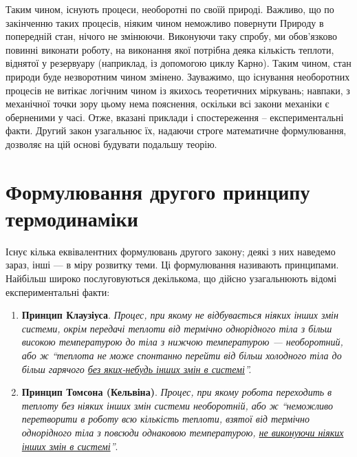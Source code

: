Таким чином, існують процеси, необоротні по своїй природі. Важливо, що по закінченню таких процесів,
ніяким чином неможливо повернути Природу в попередній стан, нічого не змінюючи. Виконуючи таку спробу,
ми обов'язково повинні виконати роботу, на виконання якої потрібна деяка кількість теплоти, віднятої у
резервуару (наприклад, із допомогою циклу Карно). Таким чином, стан природи буде незворотним чином
змінено. Зауважимо, що існування необоротних процесів не витікає логічним чином із якихось теоретичних
міркувань; навпаки, з механічної точки зору цьому нема пояснення, оскільки всі закони механіки є
оберненими у часі. Отже, вказані приклади і спостереження – експериментальні факти. Другий закон
узагальнює їх, надаючи строге математичне формулювання, дозволяє на цій основі будувати подальшу
теорію.

\section{Формулювання другого принципу термодинаміки}


Існує кілька еквівалентних формулювань другого закону; деякі з них наведемо зараз, інші --- в міру
розвитку теми. Ці формулювання називають принципами. Найбільш широко послуговуються декількома, що
дійсно узагальнюють відомі експериментальні факти:
\begin{enumerate}
	\item [а)] \textbf{Принцип Клаузіуса}. \emph{Процес, при якому не відбувається ніяких інших змін
	системи, окрім передачі теплоти від термічно однорідного тіла з більш високою температурою до тіла
	з нижчою температурою --- необоротний, або ж \enquote{теплота не може спонтанно перейти від більш
	холодного тіла до більш гарячого \underline{без яких-небудь інших змін в системі}}.}

	\item [б)] \textbf{Принцип Томсона (Кельвіна)}. \emph{Процес, при якому робота переходить в
	теплоту без ніяких інших змін системи необоротній, або ж \enquote{неможливо перетворити в роботу
	всю кількість теплоти, взятої від термічно однорідного тіла з повсюди однаковою температурою,
	\underline{не виконуючи ніяких} \underline{інших змін в системі}}}.
\end{enumerate}


